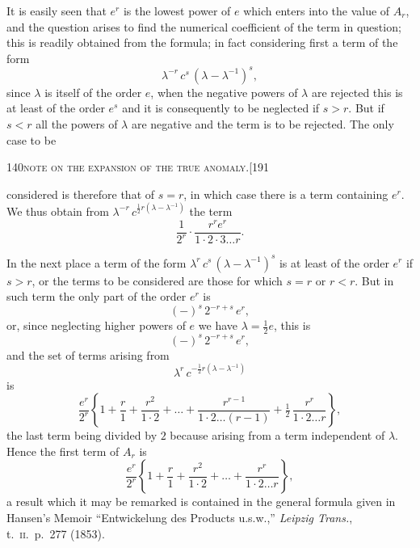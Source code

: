 \documentclass[11pt]{article}
\begin{document}
It is easily seen that $e^{r}$ is the lowest power of $e$ which enters into the value of $A_{r}$, and the question arises to find the numerical coefficient of the term in question; this is readily obtained from the formula; in fact considering first a term of the form
\[
\lambda^{-r}\,c^{s}\,(\lambda - \lambda^{-1})^{s},
\]
since $\lambda$ is itself of the order $e$, when the negative powers of $\lambda$ are rejected this is at least of the order $e^{s}$ and it is consequently to be neglected if $s > r$. But if $s < r$ all the powers of $\lambda$ are negative and the term is to be rejected. The only case to be

\newpage

\begin{center}
\small 140\hfill\textsc{note on the expansion of the true anomaly.}\hfill[191
\end{center}

\medskip

\noindent considered is therefore that of $s = r$, in which case there is a term containing $e^{r}$. We thus obtain from $\lambda^{-r}\,c^{\frac{1}{2}r(\lambda - \lambda^{-1})}$ the term
\[
\frac{1}{2^{r}}\cdot\frac{r^{r} e^{r}}{1\cdot 2\cdot 3\ldots r}.
\]

In the next place a term of the form $\lambda^{r}\,c^{s}\,(\lambda - \lambda^{-1})^{s}$ is at least of the order $e^{r}$ if $s > r$, or the terms to be considered are those for which $s = r$ or $r < r$. But in such term the only part of the order $e^{r}$ is
\[
(-)^{s}\,2^{-r+s}\,e^{r},
\]
or, since neglecting higher powers of $e$ we have $\lambda = \tfrac{1}{2} e$, this is
\[
(-)^{s}\,2^{-r+s}\,e^{r},
\]
and the set of terms arising from
\[
\lambda^{r}\,c^{-\frac{1}{2}r(\lambda - \lambda^{-1})}
\]
is
\[
\frac{e^{r}}{2^{r}}\left\{1 + \frac{r}{1} + \frac{r^{2}}{1\cdot 2} + \ldots + \frac{r^{r-1}}{1\cdot 2\ldots(r - 1)} + \tfrac{1}{2}\,\frac{r^{r}}{1\cdot 2\ldots r}\right\},
\]
the last term being divided by $2$ because arising from a term independent of $\lambda$. Hence the first term of $A_{r}$ is
\[
\frac{e^{r}}{2^{r}}\left\{1 + \frac{r}{1} + \frac{r^{2}}{1\cdot 2} + \ldots + \frac{r^{r}}{1\cdot 2\ldots r}\right\},
\]
a result which it may be remarked is contained in the general formula given in Hansen's Memoir ``Entwickelung des Products u.s.w.,'' \emph{Leipzig Trans.}, t.~\textsc{ii}.\ p.~277 (1853).
\end{document}
